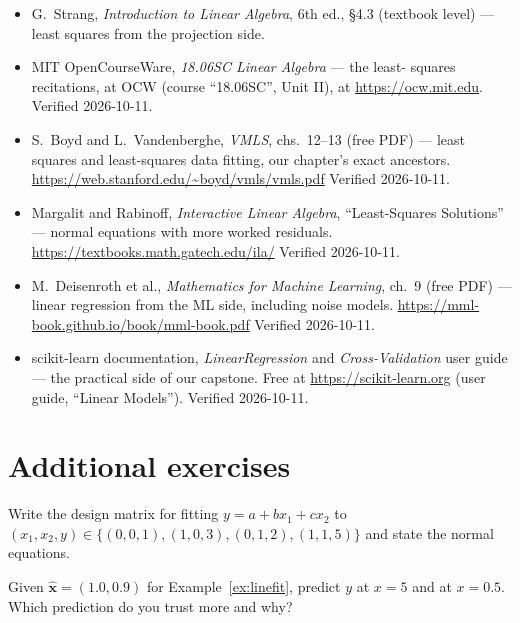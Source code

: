 \begin{itemize}
\item G.~Strang, \emph{Introduction to Linear Algebra}, 6th ed., \S4.3
(textbook level) --- least squares from the projection side.
\item MIT OpenCourseWare, \emph{18.06SC Linear Algebra} --- the least-
squares recitations, at OCW (course ``18.06SC'', Unit II), at
\url{https://ocw.mit.edu}. Verified 2026-10-11.
\item S.~Boyd and L.~Vandenberghe, \emph{VMLS}, chs.~12--13 (free PDF)
--- least squares and least-squares data fitting, our chapter's exact
ancestors. \newline
\url{https://web.stanford.edu/~boyd/vmls/vmls.pdf}
Verified 2026-10-11.
\item Margalit and Rabinoff, \emph{Interactive Linear Algebra},
``Least-Squares Solutions'' --- normal equations with more worked
residuals. \newline
\url{https://textbooks.math.gatech.edu/ila/}
Verified 2026-10-11.
\item M.~Deisenroth et al., \emph{Mathematics for Machine Learning},
ch.~9 (free PDF) --- linear regression from the ML side, including
noise models. \newline
\url{https://mml-book.github.io/book/mml-book.pdf}
Verified 2026-10-11.
\item scikit-learn documentation, \emph{LinearRegression} and
\emph{Cross-Validation} user guide --- the practical side of our
capstone. Free at \url{https://scikit-learn.org} (user guide,
``Linear Models''). Verified 2026-10-11.
\end{itemize}

\section*{Additional exercises}

\begin{exercise}[easy]
Write the design matrix for fitting $y=a+bx_1+cx_2$ to
$(x_1,x_2,y)\in\{(0,0,1),(1,0,3),(0,1,2),(1,1,5)\}$ and state the normal
equations.
\end{exercise}

\begin{exercise}[easy]
Given $\hat{\mathbf x}=(1.0,0.9)$ for Example~\ref{ex:linefit}, predict
$y$ at $x=5$ and at $x=0.5$. Which prediction do you trust more and why?
\end{exercise}


